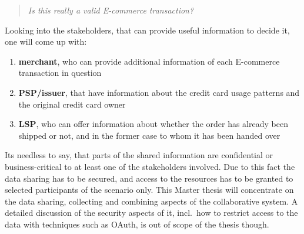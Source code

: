 \begin{quotation}
  \textit{Is this really a valid \gls{E-commerce} transaction?}
\end{quotation}

Looking into the stakeholders, that can provide useful information to decide it, one will come up with:\@

\begin{enumerate}
    \item \textbf{merchant}, who can provide additional information of each \gls{E-commerce} transaction in question
    \item \textbf{\gls{PSP}/issuer}, that have information about the credit card usage patterns and the original credit card owner
    \item \textbf{\gls{LSP}}, who can offer information about whether the order has already been shipped or not, and in the former case to whom it has been handed over
\end{enumerate}

Its needless to say, that parts of the shared information are confidential or business-critical to at least one of the stakeholders involved. Due to this fact the data sharing has to be secured, and access to the resources has to be granted to selected participants of the scenario only. This Master thesis will concentrate on the data sharing, collecting and combining aspects of the collaborative system. A detailed discussion of the security aspects of it, incl.\ how to restrict access to the data with techniques such as \gls{OAuth}, is out of scope of the thesis though.

